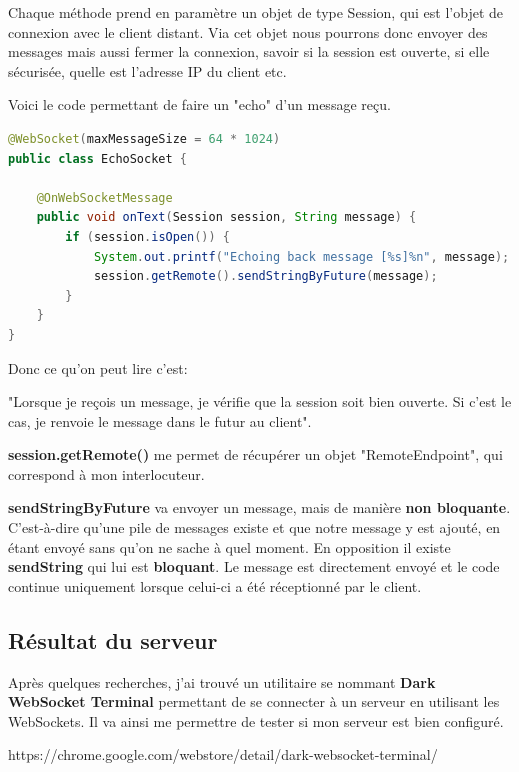 \medskip

Chaque méthode prend en paramètre un objet de type Session, qui est l'objet de connexion avec le client distant. Via cet objet nous pourrons donc envoyer des messages mais aussi fermer la connexion, savoir si la session est ouverte, si elle sécurisée, quelle est l'adresse IP du client etc.

\medskip

Voici le code permettant de faire un "echo" d'un message reçu.

\begin{lstlisting}[language=Java, caption={Code du Socket pour faire un echo}]
@WebSocket(maxMessageSize = 64 * 1024)
public class EchoSocket {
 
    @OnWebSocketMessage
    public void onText(Session session, String message) {
        if (session.isOpen()) {
            System.out.printf("Echoing back message [%s]%n", message);
            session.getRemote().sendStringByFuture(message);
        }
    }
}
\end{lstlisting}

Donc ce qu'on peut lire c'est: 

"Lorsque je reçois un message, je vérifie que la session soit bien ouverte. Si c'est le cas, je renvoie le message dans le futur au client".

\medskip

\textbf{session.getRemote()} me permet de récupérer un objet "RemoteEndpoint", qui correspond à mon interlocuteur.

\textbf{sendStringByFuture} va envoyer un message, mais de manière \textbf{non bloquante}. C'est-à-dire qu'une pile de messages existe et que notre message y est ajouté, en étant envoyé sans qu'on ne sache à quel moment. En opposition il existe \textbf{sendString} qui lui est \textbf{bloquant}. Le message est directement envoyé et le code continue uniquement lorsque celui-ci a été réceptionné par le client.

\subsection{Résultat du serveur}
Après quelques recherches, j'ai trouvé un utilitaire se nommant \textbf{Dark WebSocket Terminal}
 permettant de se connecter à un serveur en utilisant les WebSockets. Il va ainsi me permettre de tester si mon serveur est bien configuré.
 
https://chrome.google.com/webstore/detail/dark-websocket-terminal/

